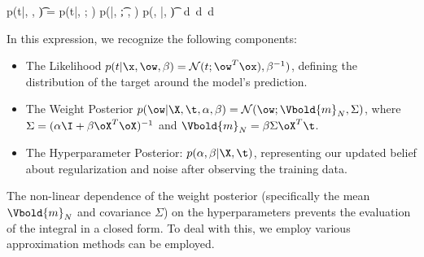 \begin{myequation}
p(t|\x, \X, \t) = \int p(t|\x, \ow; \beta) p(\ow|\X, \t; \alpha, \beta) p(\alpha, \beta|\X, \t) \, d\ow \, d\alpha \, d\beta
\end{myequation}

In this expression, we recognize the following components:
\begin{itemize}
    \item The Likelihood $p(t|\x, \ow, \beta) = \mathcal{N}(t; \ow^T\ox), \beta^{-1})$, defining the distribution of the target around the model's prediction.
    \item The Weight Posterior $p(\ow|\X, \t, \alpha, \beta) = \mathcal{N}(\ow; \Vbold{m}_N, \Sigma)$, where $\Sigma = (\alpha\I + \beta\oX^T\oX)^{-1}$ and $\Vbold{m}_N = \beta\Sigma\oX^T\t$.
    \item The Hyperparameter Posterior: $p(\alpha, \beta | \X, \t)$, representing our updated belief about regularization and noise after observing the training data.
\end{itemize}

The non-linear dependence of the weight posterior (specifically the mean $\Vbold{m}_N$ and covariance $\Sigma$) on the hyperparameters prevents the evaluation of the integral in a closed form. To deal with this, we employ various approximation methods can be employed.

